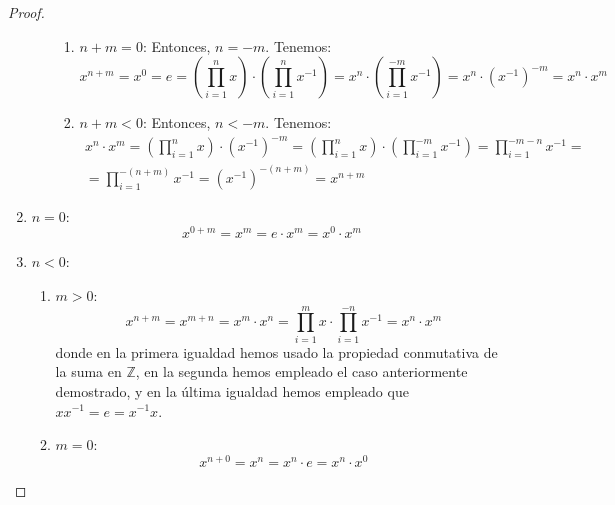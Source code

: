 \begin{prop}
\begin{proof}
\begin{enumerate}
\begin{enumerate}
\begin{enumerate}
                \item \ul{$n+m=0$}:
                Entonces, $n=-m$. Tenemos:
                \begin{equation*}
                    x^{n+m} = x^0 = e =\left(\prod_{i=1}^n x\right) \cdot\left(\prod_{i=1}^{n} x^{-1}\right) = x^n \cdot\left(\prod_{i=1}^{-m} x^{-1}\right) = x^n \cdot \left(x^{-1}\right)^{-m} = x^n \cdot x^m
                \end{equation*}

                \item \ul{$n+m<0$}:
                Entonces, $n<-m$. Tenemos:
                \begin{multline*}
                    x^n \cdot x^m =\left(\prod_{i=1}^n x\right)\cdot \left(x^{-1}\right)^{-m}
                    =\left(\prod_{i=1}^n x \right)\cdot\left(\prod_{i=1}^{-m} x^{-1}\right) =\prod_{i=1}^{-m-n} x^{-1}
                    =\\=\prod_{i=1}^{-(n+m)} x^{-1} = (x^{-1})^{-(n+m)} = x^{n+m}
                \end{multline*}
            \end{enumerate}

        \end{enumerate}

        \item \ul{$n=0$}:
        \begin{equation*}
            x^{0+m} = x^m = e \cdot x^m = x^0 \cdot x^m
        \end{equation*}

        \item \ul{$n<0$}:
        \begin{enumerate}
            \item \ul{$m>0$}:
            \begin{equation*}
                x^{n+m} = x^{m+n} = x^{m} \cdot x^{n}
                = \prod_{i=1}^{m} x \cdot \prod_{i=1}^{-n} x^{-1}
                = x^n \cdot x^m
            \end{equation*}
            donde en la primera igualdad hemos usado la propiedad conmutativa de la suma en $\mathbb{Z}$, en la segunda hemos empleado el caso anteriormente demostrado, y en la última igualdad hemos empleado que $xx^{-1} = e = x^{-1}x$.

            \item \ul{$m=0$}:
            \begin{equation*}
                x^{n+0} = x^n = x^n \cdot e = x^n \cdot x^0
            \end{equation*}


\end{enumerate}
\end{enumerate}
\end{proof}
\end{prop}
